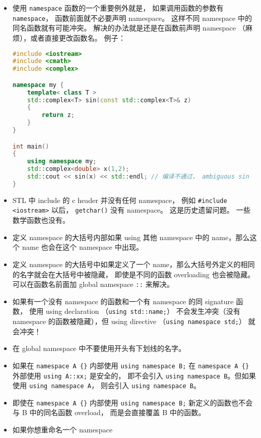 
\begin{issues}
\issueDraft
\end{issues}

\begin{itemize}
\item 使用 \verb|namespace| 函数的一个重要例外就是， 如果调用函数的参数有 \verb|namespace|， 函数前面就不必要声明 namespace。 这样不同 namespace 中的同名函数就有可能冲突。 解决的办法就是还是在函数前声明 namespace （麻烦），或者直接更改函数名。 例子：
\begin{lstlisting}[language=cpp]
#include <iostream>
#include <cmath>
#include <complex>

namespace my {
	template< class T >
	std::complex<T> sin(const std::complex<T>& z)
	{
		return z;
	}
}

int main()
{
	using namespace my;
	std::complex<double> x(1,2);
	std::cout << sin(x) << std::endl; // 编译不通过， ambiguous sin
}
\end{lstlisting}
\item STL 中 include 的 c header 并没有任何 namespace， 例如 \verb|#include <iostream>| 以后， \verb|getchar()| 没有 namespace。 这是历史遗留问题。 一些数学函数也没有。
\item 定义 namespace 的大括号内部如果 using 其他 namespace 中的 name，那么这个 name 也会在这个 namespace 中出现。
\item 定义 namespace 的大括号中如果定义了一个 name，那么大括号外定义的相同的名字就会在大括号中被隐藏， 即使是不同的函数 overloading 也会被隐藏。 可以在函数名前面加 global namespace \verb|::| 来解决。
\item 如果有一个没有 namespace 的函数和一个有 namespace 的同 signature 函数， 使用 using declaration （\verb|using std::name;|） 不会发生冲突（没有 namespace 的函数被隐藏），但 using directive （\verb|using namespace std;|） 就会冲突！
\item 在 global namespace 中不要使用开头有下划线的名字。
\item 如果在 \verb|namespace A {}| 内部使用 \verb|using namespace B;| 在 \verb|namespace A {}| 外部使用 \verb|using A::xx;| 是安全的， 即不会引入 \verb|using namespace B|。但如果使用 \verb|using namespace A|， 则会引入 \verb|using namespace B|。
\item 即使在 \verb|namespace A {}| 内部使用 \verb|using namespace B;|  新定义的函数也不会与 B 中的同名函数 overload， 而是会直接覆盖 B 中的函数。
\item 如果你想重命名一个 namespace
\end{itemize}
